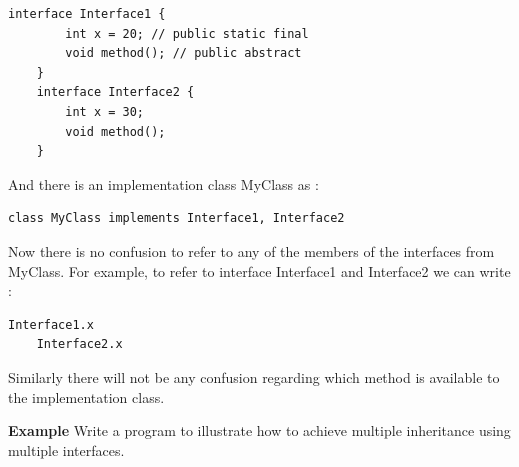 \documentclass[11pt,a4paper]{article}
\begin{document}
\begin{lstlisting}[numbers=none]
    interface Interface1 {
        int x = 20; // public static final
        void method(); // public abstract
    }
    interface Interface2 {
        int x = 30;
        void method();
    }
\end{lstlisting}
And there is an implementation class MyClass as :

\begin{lstlisting}[numbers=none]
    class MyClass implements Interface1, Interface2 
\end{lstlisting}

Now there is no confusion to refer to any of the members of the interfaces from MyClass. For example, to refer to interface Interface1 and Interface2 we can write :
\begin{lstlisting}[numbers=none]
    Interface1.x
    Interface2.x
\end{lstlisting}

Similarly there will not be any confusion regarding which method is available to the implementation class.

\textbf{Example} Write a program to illustrate how to achieve multiple inheritance using multiple interfaces.
\end{document}

